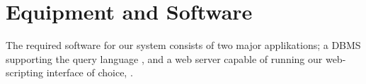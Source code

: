 \section{Equipment and Software}
\label{sec:equipmentsoftware}

The required software for our system consists of two major applikations; a DBMS supporting the query language \sql[], and a web server capable of running our web-scripting interface of choice, \aspnet[].